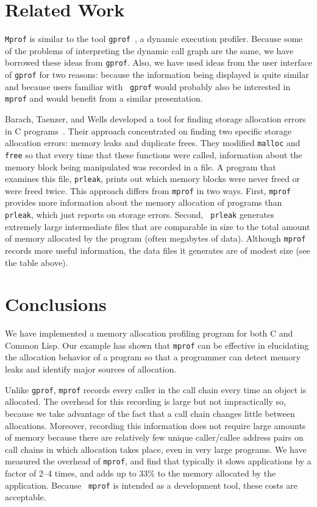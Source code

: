 \section{Related Work}
\label{related work}

{\tt Mprof} is similar to the tool {\tt gprof}~\cite{graham83:gprof},
a dynamic execution profiler.  Because some of the problems of
interpreting the dynamic call graph are the same, we have borrowed
these ideas from {\tt gprof}.  Also, we have used ideas from the user
interface of {\tt gprof} for two reasons: because the information
being displayed is quite similar and because users familiar with {\tt
gprof} would probably also be interested in {\tt mprof} and would
benefit from a similar presentation.

Barach, Taenzer, and Wells developed a tool for finding storage
allocation errors in C programs~\cite{barach82:memprof}.  Their
approach concentrated on finding two specific storage allocation
errors: memory leaks and duplicate frees.  They modified {\tt malloc}
and {\tt free} so that every time that these functions were called,
information about the memory block being manipulated was recorded in a
file.  A program that examines this file, {\tt prleak}, prints out
which memory blocks were never freed or were freed twice.  This
approach differs from {\tt mprof} in two ways.  First, {\tt mprof}
provides more information about the memory allocation of programs than
{\tt prleak}, which just reports on storage errors.  Second, {\tt
prleak} generates extremely large intermediate files that are
comparable in size to the total amount of memory allocated by the
program (often megabytes of data).  Although {\tt mprof} records more
useful information, the data files it generates are of modest size
(see the table above).

\section{Conclusions}
\label{conclusions}

We have implemented a memory allocation profiling program for both C
and Common Lisp.  Our example has shown that {\tt mprof} can be
effective in elucidating the allocation behavior of a program so that
a programmer can detect memory leaks and identify major sources of
allocation.

Unlike {\tt gprof}, {\tt mprof} records every caller in the call chain
every time an object is allocated.  The overhead for this recording is
large but not impractically so, because we take advantage of the fact
that a call chain changes little between allocations.  Moreover,
recording this information does not require large amounts of memory
because there are relatively few unique caller/callee address pairs on
call chains in which allocation takes place, even in very large
programs.  We have measured the overhead of {\tt mprof}, and find that
typically it slows applications by a factor of 2--4 times, and adds up
to 33\% to the memory allocated by the application.  Because {\tt
mprof} is intended as a development tool, these costs are acceptable.

